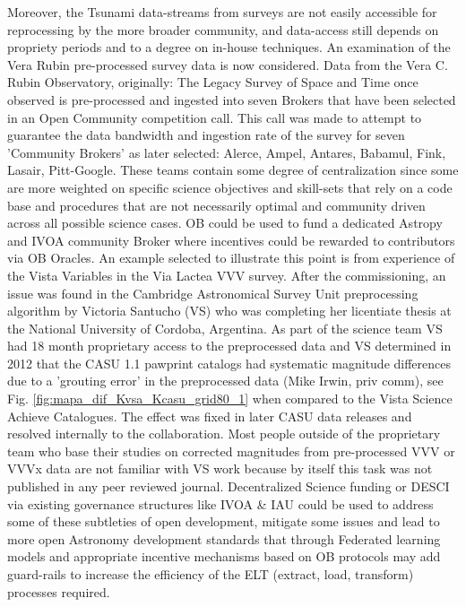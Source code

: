 \documentclass[final,5p,times,twocolumn,authoryear]{elsarticle}
\begin{document}
Moreover, the Tsunami data-streams from surveys are not easily accessible for reprocessing by the more broader community, and data-access still depends on propriety periods and to a degree on in-house techniques. An examination of the Vera Rubin pre-processed survey data is now considered. Data from the Vera C. Rubin Observatory, originally: The Legacy Survey of Space and Time once observed is pre-processed and ingested into seven Brokers that have been selected in an Open Community competition call.  This call was made to attempt to guarantee the data bandwidth and ingestion rate of the survey for seven 'Community Brokers' as later selected: Alerce, Ampel, Antares, Babamul, Fink, Lasair, Pitt-Google. These teams contain some degree of centralization since some are more weighted on specific science objectives and skill-sets that rely on a code base and procedures that are not necessarily optimal and community driven across all possible science cases. OB could be used to fund a dedicated Astropy and IVOA community Broker where incentives could be rewarded to contributors via OB Oracles. An example selected to illustrate this point is from experience of the Vista Variables in the Via Lactea VVV survey. After the commissioning, an issue was found in the Cambridge Astronomical Survey Unit preprocessing algorithm by Victoria Santucho (VS) who was completing her licentiate thesis at the National University of Cordoba, Argentina. As part of the science team VS had 18 month proprietary access to the preprocessed data and VS determined in 2012 that the CASU 1.1 pawprint catalogs had systematic magnitude differences due to a 'grouting error' in the preprocessed data (Mike Irwin, priv comm), see Fig. \ref{fig:mapa_dif_Kvsa_Kcasu_grid80_1} when compared to the Vista Science Achieve Catalogues. The effect was fixed in later CASU data releases and resolved internally to the collaboration. Most people outside of the proprietary team who base their studies on corrected magnitudes from pre-processed VVV or VVVx data are not familiar with VS work because by itself this task was not published in any peer reviewed journal. Decentralized Science funding or DESCI via existing governance structures like IVOA \& IAU could be used to address some of these subtleties of open development, mitigate some issues and lead to more open Astronomy development standards that through Federated learning models and appropriate incentive mechanisms based on OB protocols may add guard-rails to increase the efficiency of the  ELT (extract, load, transform) processes required.
\end{document}
